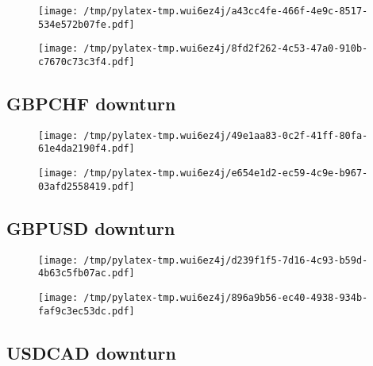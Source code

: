 \documentclass{article}%
\begin{document}
\begin{figure}[htbp]%
\centering%
\texttt{[image: /tmp/pylatex-tmp.wui6ez4j/a43cc4fe-466f-4e9c-8517-534e572b07fe.pdf]}%
\end{figure}

%


\begin{figure}[htbp]%
\centering%
\texttt{[image: /tmp/pylatex-tmp.wui6ez4j/8fd2f262-4c53-47a0-910b-c7670c73c3f4.pdf]}%
\end{figure}

%
\newpage %
\subsection{GBPCHF downturn}%
\label{subsec:GBPCHFdownturn}%


\begin{figure}[htbp]%
\centering%
\texttt{[image: /tmp/pylatex-tmp.wui6ez4j/49e1aa83-0c2f-41ff-80fa-61e4da2190f4.pdf]}%
\end{figure}

%


\begin{figure}[htbp]%
\centering%
\texttt{[image: /tmp/pylatex-tmp.wui6ez4j/e654e1d2-ec59-4c9e-b967-03afd2558419.pdf]}%
\end{figure}

%
\newpage %
\subsection{GBPUSD downturn}%
\label{subsec:GBPUSDdownturn}%


\begin{figure}[htbp]%
\centering%
\texttt{[image: /tmp/pylatex-tmp.wui6ez4j/d239f1f5-7d16-4c93-b59d-4b63c5fb07ac.pdf]}%
\end{figure}

%


\begin{figure}[htbp]%
\centering%
\texttt{[image: /tmp/pylatex-tmp.wui6ez4j/896a9b56-ec40-4938-934b-faf9c3ec53dc.pdf]}%
\end{figure}

%
\newpage %
\subsection{USDCAD downturn}%
\label{subsec:USDCADdownturn}%
\end{document}
